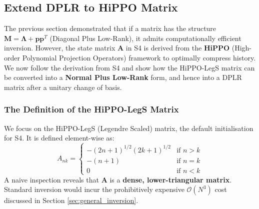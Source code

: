\documentclass[a4paper,11pt]{article}
\begin{document}
\subsection{Extend DPLR to HiPPO Matrix}
\label{sec:hippo_intro}

The previous section demonstrated that if a matrix has the structure $\mathbf{M}=\mathbf{\Lambda}+\mathbf{p}\mathbf{p}^T$ (Diagonal Plus Low-Rank), it admits computationally efficient inversion. However, the state matrix $\mathbf{A}$ in S4 is derived from the \textbf{HiPPO} (High-order Polynomial Projection Operators) framework to optimally compress history. We now follow the derivation from S4 and show how the HiPPO-LegS matrix can be converted into a \textbf{Normal Plus Low-Rank} form, and hence into a DPLR matrix after a unitary change of basis.

\subsubsection{The Definition of the HiPPO-LegS Matrix}
We focus on the HiPPO-LegS (Legendre Scaled) matrix, the default initialisation for S4. It is defined element-wise as:
\begin{equation} \label{eq:hippo_def}
    A_{nk} = \begin{cases} 
    -(2n+1)^{1/2}(2k+1)^{1/2} & \text{if } n > k \\
    -(n+1) & \text{if } n = k \\
    0 & \text{if } n < k 
    \end{cases}
\end{equation}
A naive inspection reveals that $\mathbf{A}$ is a \textbf{dense, lower-triangular matrix}. Standard inversion would incur the prohibitively expensive $\mathcal{O}(N^3)$ cost discussed in Section \ref{sec:general_inversion}.
\end{document}
